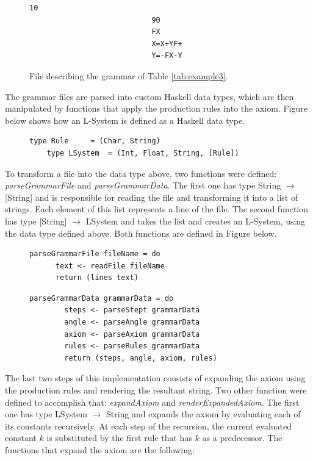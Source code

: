 \documentclass{article}
\begin{document}
\begin{figure}[!h]
\centering
\begin{lstlisting}[style=TextStyle]
                            10
                            90
                            FX
                            X=X+YF+
                            Y=-FX-Y
\end{lstlisting}
\vskip -6pt
\caption{File describing the grammar of Table \ref{tab:example3}.}
\label{fig:file}
\end{figure}

The grammar files are parsed into custom Haskell data types, which are then
manipulated by functions that apply the production rules into the axiom. Figure
below shows how an L-System is defined as a Haskell data type.

\begin{figure}[!h]
\centering
\begin{lstlisting}[style=BashStyle]
    type Rule     = (Char, String)
    type LSystem  = (Int, Float, String, [Rule])
\end{lstlisting}
\vskip -6pt
\end{figure}

To transform a file into the data type above, two functions were defined:
\textit{parseGrammarFile} and \textit{parseGrammarData}. The first one has
type String $\rightarrow$ [String] and is responsible for reading the file
and transforming it into a list of strings. Each element of this list represents
a line of the file. The second function has type [String] $\rightarrow$ LSystem
and takes the list and creates an L-System, using the data type defined above.
Both functions are defined in Figure below.

\begin{figure}[!h]
\centering
\begin{lstlisting}[style=BashStyle]
    parseGrammarFile fileName = do
      text <- readFile fileName
      return (lines text)
\end{lstlisting}
\begin{lstlisting}[style=BashStyle]
    parseGrammarData grammarData = do
        steps <- parseStept grammarData
        angle <- parseAngle grammarData
        axiom <- parseAxiom grammarData
        rules <- parseRules grammarData
        return (steps, angle, axiom, rules)
\end{lstlisting}
\vskip -6pt
\end{figure}

The last two steps of this implementation consists of expanding the axiom using
the production rules and rendering the resultant string. Two other function were
defined to accomplish that: \textit{expandAxiom} and \textit{renderExpandedAxiom}.
The first one has type LSystem $\rightarrow$ String and expands the axiom by
evaluating each of its constants recursively. At each step of the recursion, the
current evaluated constant $k$ is substituted by the first rule that has $k$
as a predecessor. The functions that expand the axiom are the following:
\end{document}
